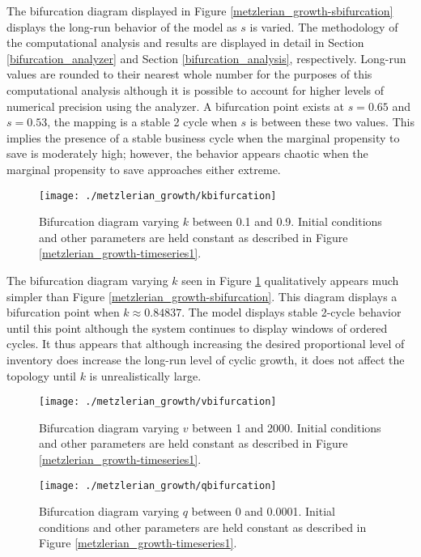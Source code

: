 The bifurcation diagram displayed in Figure \ref{metzlerian_growth-sbifurcation} displays the long-run behavior of the model as $s$ is varied. The methodology of the computational analysis and results are displayed in detail in Section \ref{bifurcation_analyzer} and Section \ref{bifurcation_analysis}, respectively. Long-run values are rounded to their nearest whole number for the purposes of this computational analysis although it is possible to account for higher levels of numerical precision using the analyzer. A bifurcation point exists at $s=0.65$ and $s=0.53$, the mapping is a stable 2 cycle when $s$ is between these two values. This implies the presence of a stable business cycle when the marginal propensity to save is moderately high; however, the behavior appears chaotic when the marginal propensity to save approaches either extreme. 

\begin{figure}
    \centering
    \texttt{[image: ./metzlerian\_growth/kbifurcation]}
    \caption{Bifurcation diagram varying $k$ between 0.1 and 0.9. Initial conditions and other parameters are held constant as described in Figure \ref{metzlerian_growth-timeseries1}.}
    \label{metzlerian_growth-kbifurcation}
\end{figure}

The bifurcation diagram varying $k$ seen in Figure \ref{metzlerian_growth-kbifurcation} qualitatively appears much simpler than Figure \ref{metzlerian_growth-sbifurcation}. This diagram displays a bifurcation point when $k\approx 0.84837$. The model displays stable 2-cycle behavior until this point although the system continues to display windows of ordered cycles. It thus appears that although increasing the desired proportional level of inventory does increase the long-run level of cyclic growth, it does not affect the topology until $k$ is unrealistically large. 

\begin{figure}
    \centering
    \texttt{[image: ./metzlerian\_growth/vbifurcation]}
    \caption{Bifurcation diagram varying $v$ between 1 and 2000. Initial conditions and other parameters are held constant as described in Figure \ref{metzlerian_growth-timeseries1}.}
    \label{metzlerian_growth-vbifurcation}
\end{figure}
\begin{figure}
    \centering
    \texttt{[image: ./metzlerian\_growth/qbifurcation]}
    \caption{Bifurcation diagram varying $q$ between 0 and 0.0001. Initial conditions and other parameters are held constant as described in Figure \ref{metzlerian_growth-timeseries1}.}
    \label{metzlerian_growth-qbifurcation}
\end{figure}


